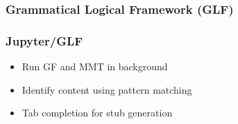 \documentclass{beamer}
\def\glfdiagMMT{black!10}
\def\glfdiagHighlight{blue!70!green!60}
\begin{document}
\begin{frame}
    \frametitle{Grammatical Logical Framework (GLF)}

    \vspace{1em}
        \def\glfdiagMMT{\glfdiagHighlight}
        
\end{frame}


% 

\begin{frame}
    \frametitle{Jupyter/GLF}
    \begin{itemize}
        \item Run GF and MMT in background
        \item Identify content using pattern matching
        \item Tab completion for stub generation
    \end{itemize}

    \vspace{1em}
    
\end{frame}
\end{document}
